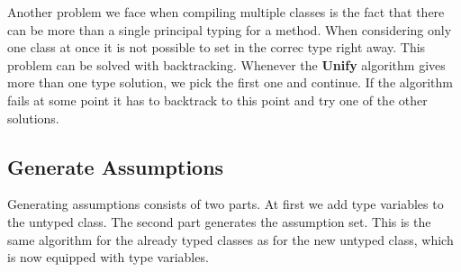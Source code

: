 \documentclass[runningheads]{llncs}
\begin{document}
Another problem we face when compiling multiple classes is the fact that there can be more than a single principal typing for a method.
When considering only one class at once it is not possible to set in the correc type right away.
This problem can be solved with backtracking.
Whenever the \textbf{Unify} algorithm gives more than one type solution, we pick the first one and continue.
If the algorithm fails at some point it has to backtrack to this point and try one of the other solutions.

\subsection{Generate Assumptions}


Generating assumptions consists of two parts.
At first we add type variables to the untyped class.
The second part generates the assumption set.
This is the same algorithm for the already typed classes as for the 
new untyped class, which is now equipped with type variables.
\end{document}
